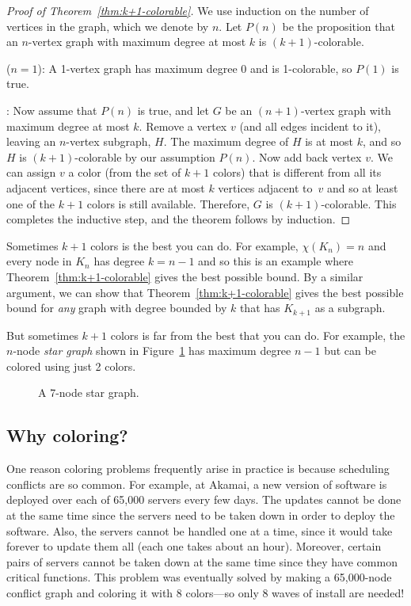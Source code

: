 \begin{proof}[Proof of Theorem~\ref{thm:k+1-colorable}]
We use induction on the number of vertices in the graph, which we
denote by $n$.  Let $P(n)$ be the proposition that an $n$-vertex graph
with maximum degree at most $k$ is $(k+1)$-colorable.

 ($n=1$): A 1-vertex graph has maximum degree
0 and is 1-colorable, so $P(1)$ is true.

: Now assume that $P(n)$ is true, and
let $G$ be an $(n+1)$-vertex graph with maximum degree at most $k$.
Remove a vertex $v$ (and all edges incident to it), leaving an
$n$-vertex subgraph, $H$.  The maximum degree of $H$ is at most $k$,
and so $H$ is $(k+1)$-colorable by our assumption $P(n)$.  Now add
back vertex $v$.  We can assign $v$ a color (from the set of $k + 1$
colors) that is different from all its adjacent vertices, since there
are at most $k$ vertices adjacent to~$v$ and so at least one of the
$k+1$ colors is still available.  Therefore, $G$ is $(k+1)$-colorable.
This completes the inductive step, and the theorem follows by
induction.
\end{proof}

Sometimes $k+1$ colors is the best you can do.  For example, $\chi(K_n) = n$
and every node in $K_n$ has degree $k = n - 1$ and so this is an example where
Theorem~\ref{thm:k+1-colorable} gives the best possible bound.  By a
similar argument, we can show that Theorem~\ref{thm:k+1-colorable} gives
the best possible bound for \emph{any} graph with degree bounded by
$k$ that has $K_{k+1}$ as a subgraph.

But sometimes $k+1$ colors is far from the best that you can do.
For example, the $n$-node \emph{star graph} shown in
Figure~\ref{fig:5T} has maximum degree $n - 1$ but can be colored
using just 2 colors.

\begin{figure}


\caption{A 7-node star graph.}

\label{fig:5T}

\end{figure}


\subsection{Why coloring?}

One reason coloring problems frequently arise in practice is because
scheduling conflicts are so common.  For example, at Akamai, a new
version of software is deployed over each of 65,000 servers every few
days.  The updates cannot be done at the same time since the servers
need to be taken down in order to deploy the software.  Also, the
servers cannot be handled one at a time, since it would take forever
to update them all (each one takes about an hour).  Moreover, certain
pairs of servers cannot be taken down at the same time since they have
common critical functions.  This problem was eventually solved by
making a 65,000-node conflict graph and coloring it with 8 colors---so
only 8 waves of install are needed!

